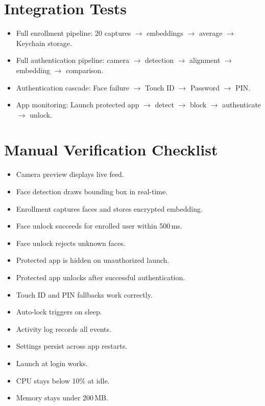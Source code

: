 \documentclass[12pt,a4paper]{report}
\begin{document}
\section{Integration Tests}
\begin{itemize}[noitemsep]
    \item Full enrollment pipeline: 20 captures $\to$ embeddings $\to$ average $\to$ Keychain storage.
    \item Full authentication pipeline: camera $\to$ detection $\to$ alignment $\to$ embedding $\to$ comparison.
    \item Authentication cascade: Face failure $\to$ Touch ID $\to$ Password $\to$ PIN.
    \item App monitoring: Launch protected app $\to$ detect $\to$ block $\to$ authenticate $\to$ unlock.
\end{itemize}

\section{Manual Verification Checklist}
\begin{itemize}[noitemsep]
    \item Camera preview displays live feed.
    \item Face detection draws bounding box in real-time.
    \item Enrollment captures faces and stores encrypted embedding.
    \item Face unlock succeeds for enrolled user within 500\,ms.
    \item Face unlock rejects unknown faces.
    \item Protected app is hidden on unauthorized launch.
    \item Protected app unlocks after successful authentication.
    \item Touch ID and PIN fallbacks work correctly.
    \item Auto-lock triggers on sleep.
    \item Activity log records all events.
    \item Settings persist across app restarts.
    \item Launch at login works.
    \item CPU stays below 10\% at idle.
    \item Memory stays under 200\,MB.
\end{itemize}

\end{document}
